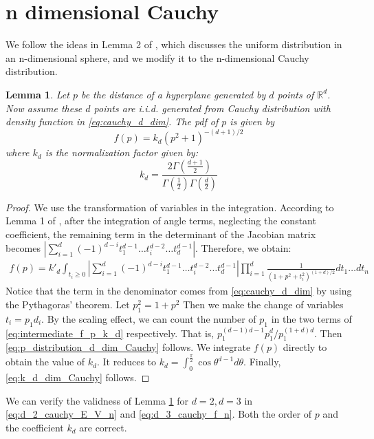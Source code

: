 \documentclass{article}
\newtheorem{lemma}{Lemma}
\def\R{\mathbb{R}}
\begin{document}
\section{n dimensional Cauchy}
We follow the ideas in Lemma 2 of \cite{raynaud1970enveloppe},
which discusses the uniform distribution in an n-dimensional sphere,
and we modify it to the n-dimensional Cauchy distribution.
\begin{lemma}\label{lem:p_distribution_d_dim_Cauchy}
    Let $p$ be the distance of a hyperplane generated by $d$ points of $\R^d$.
    Now assume these $d$ points are i.i.d. generated from Cauchy distribution with density
    function in \eqref{eq:cauchy_d_dim}.
    The pdf of $p$ is given by
    \begin{equation}\label{eq:p_distribution_d_dim_Cauchy}
        f(p) = k_d (p^2+1)^{-(d+1)/2}
    \end{equation}
    where $k_d$ is the normalization factor given by:
    \begin{equation}\label{eq:k_d_dim_Cauchy}
        k_d = \frac{2 \Gamma \left(\frac{d+1}{2} \right)}{
            \Gamma(\frac{1}{2})
            \Gamma(\frac{d}{2})
        }
    \end{equation}
\end{lemma}
\begin{proof}
    We use the transformation of variables in the integration.
    According to Lemma 1 of  \cite{raynaud1970enveloppe},
    after the integration of angle terms, neglecting the constant coefficient,
    the remaining term in the determinant of the Jacobian matrix becomes
    $|\sum_{i=1}^d (-1)^{d-i} t^{d-1}_1 \dots 
    t^{d-2}_i \dots t^{d-1}_d|$.
    Therefore, we obtain:
    \begin{align}\label{eq:intermediate_f_p_k_d}
        f(p) = k'_d \int_{t_i\geq 0}|\sum_{i=1}^d (-1)^{d-i} t^{d-1}_1 \dots 
        t^{d-2}_i \dots t^{d-1}_d|
        \prod_{i=1}^d \frac{1}{(1+p^2+t_i^2)^{(1+d)/2}}dt_1 \dots dt_n
    \end{align}
    Notice that the term in the denominator
    comes from \eqref{eq:cauchy_d_dim} by using
    the Pythagoras' theorem.
    Let $p_1^2=1+p^2$
    Then we make the change of variables $t_i = p_1d_i$.
    By the scaling effect, we can count the number of $p_1$
    in the two terms of \eqref{eq:intermediate_f_p_k_d}
    respectively. That is, $p_1^{(d-1)d-1}p_1^d / p_1^{(1+d)d}$.
    Then \eqref{eq:p_distribution_d_dim_Cauchy} follows.
    We integrate $f(p)$ directly to obtain the value of $k_d$.
    It reduces to $k_d=\int_0^{\frac{\pi}{2}} \cos\theta^{d-1} d\theta$.
    Finally, \eqref{eq:k_d_dim_Cauchy} follows.
\end{proof}
We can verify the validness of Lemma \ref{lem:p_distribution_d_dim_Cauchy}
for $d=2,d=3$ in \eqref{eq:d_2_cauchy_E_V_n} and \eqref{eq:d_3_cauchy_f_n}.
Both the order of $p$ and the coefficient $k_d$ are correct.
\end{document}
